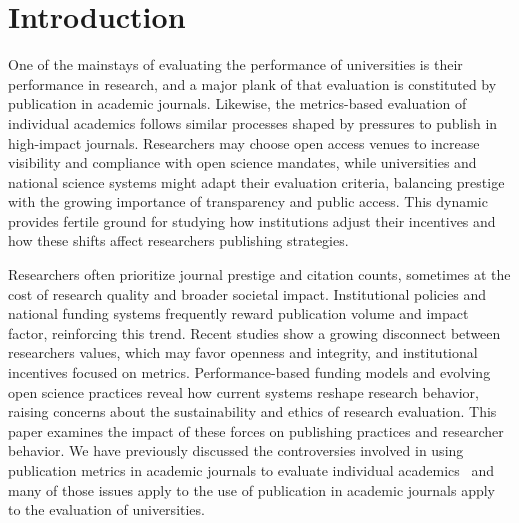 \documentclass[amsfonts, amssymb, prl, superscriptaddress, notitlepage, twocolumn, nofootinbib]{revtex4-2}
\begin{document}
\section{Introduction}
One of the mainstays of evaluating the performance of universities is their performance in research, and a major plank of that evaluation is constituted by publication in academic journals. Likewise, the metrics-based evaluation of individual academics follows similar processes shaped by pressures to publish in high-impact journals. Researchers may choose open access venues to increase visibility and compliance with open science mandates, while universities and national science systems might adapt their evaluation criteria, balancing prestige with the growing importance of transparency and public access. This dynamic provides fertile ground for studying how institutions adjust their incentives and how these shifts affect researchers publishing strategies.

Researchers often prioritize journal prestige and citation counts, sometimes at the cost of research quality and broader societal impact. Institutional policies and national funding systems frequently reward publication volume and impact factor, reinforcing this trend. Recent studies show a growing disconnect between researchers values, which may favor openness and integrity, and institutional incentives focused on metrics. Performance-based funding models and evolving open science practices reveal how current systems reshape research behavior, raising concerns about the sustainability and ethics of research evaluation. This paper examines the impact of these forces on publishing practices and researcher behavior. We have previously discussed the controversies involved in using publication metrics in academic journals to evaluate individual academics~\cite{watson2023assessing} and many of those issues apply to the use of publication in academic journals apply to the evaluation of universities.
\end{document}
